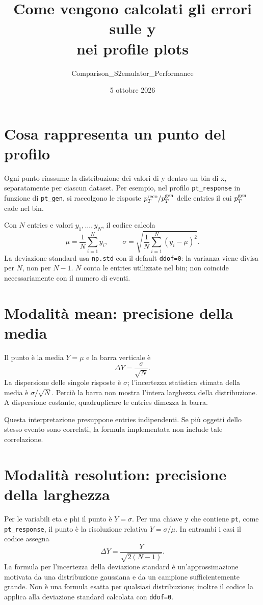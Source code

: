 \documentclass[11pt,a4paper]{article}
\title{Come vengono calcolati gli errori sulle y\\nei profile plots}
\author{Comparison\_S2emulator\_Performance}
\date{5 ottobre 2026}
\begin{document}
\maketitle

\section{Cosa rappresenta un punto del profilo}
Ogni punto riassume la distribuzione dei valori di y dentro un bin di x, separatamente per ciascun dataset. Per esempio, nel profilo \texttt{pt\_response} in funzione di \texttt{pt\_gen}, si raccolgono le risposte $p_T^{\rm reco}/p_T^{\rm gen}$ delle entries il cui $p_T^{\rm gen}$ cade nel bin.

Con $N$ entries e valori $y_1,\ldots,y_N$, il codice calcola
\[
\mu=\frac{1}{N}\sum_{i=1}^{N}y_i,\qquad
\sigma=\sqrt{\frac{1}{N}\sum_{i=1}^{N}(y_i-\mu)^2}.
\]
La deviazione standard usa \texttt{np.std} con il default \texttt{ddof=0}: la varianza viene divisa per $N$, non per $N-1$. $N$ conta le entries utilizzate nel bin; non coincide necessariamente con il numero di eventi.

\section{Modalità mean: precisione della media}
Il punto è la media $Y=\mu$ e la barra verticale è
\[
\boxed{\Delta Y=\frac{\sigma}{\sqrt{N}}}.
\]
La dispersione delle singole risposte è $\sigma$; l'incertezza statistica stimata della media è $\sigma/\sqrt{N}$. Perciò la barra non mostra l'intera larghezza della distribuzione. A dispersione costante, quadruplicare le entries dimezza la barra.

Questa interpretazione presuppone entries indipendenti. Se più oggetti dello stesso evento sono correlati, la formula implementata non include tale correlazione.

\section{Modalità resolution: precisione della larghezza}
Per le variabili eta e phi il punto è $Y=\sigma$. Per una chiave y che contiene \texttt{pt}, come \texttt{pt\_response}, il punto è la risoluzione relativa $Y=\sigma/\mu$. In entrambi i casi il codice assegna
\[
\boxed{\Delta Y=\frac{Y}{\sqrt{2(N-1)}}}.
\]
La formula per l'incertezza della deviazione standard è un'approssimazione motivata da una distribuzione gaussiana e da un campione sufficientemente grande. Non è una formula esatta per qualsiasi distribuzione; inoltre il codice la applica alla deviazione standard calcolata con \texttt{ddof=0}.
\end{document}
